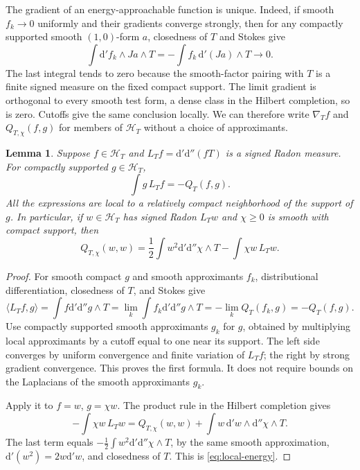 \documentclass[11pt]{article}
\newtheorem{lemma}[theorem]{Lemma}
\newcommand{\dd}{\mathrm d'\mathrm d''}
\begin{document}
The gradient of an energy-approachable function is unique. Indeed,
if smooth $f_k\to0$ uniformly and their gradients converge strongly,
then for any compactly supported smooth $(1,0)$-form $a$, closedness of
$T$ and Stokes give
\[
 \int\mathrm d'f_k\wedge Ja\wedge T
       =-\int f_k\,\mathrm d'(Ja)\wedge T\longrightarrow0.
\]
The last integral tends to zero because the smooth-factor pairing with
$T$ is a finite signed measure on the fixed compact support.
The limit gradient is orthogonal to every smooth test form, a dense
class in the Hilbert completion, so is zero. Cutoffs give the same
conclusion locally. We can therefore write $\nabla_T f$ and
$Q_{T,\chi}(f,g)$ for members of $\mathscr H_T$ without a choice of
approximants.

\begin{lemma}\label{lem:test}
Suppose $f\in\mathscr H_T$ and $L_Tf=\dd(fT)$ is a signed Radon
measure. For compactly supported $g\in\mathscr H_T$,
\[
                 \int g\,L_Tf=-Q_T(f,g).
\]
All the expressions are local to a relatively compact neighborhood of
the support of $g$. In particular, if $w\in\mathscr H_T$ has signed
Radon $L_Tw$ and $\chi\geq0$ is smooth with compact support, then
\begin{equation}\label{eq:local-energy}
 Q_{T,\chi}(w,w)=\frac12\int w^2\dd\chi\wedge T
                         -\int\chi w\,L_Tw.
\end{equation}
\end{lemma}
\begin{proof}
For smooth compact $g$ and smooth approximants $f_k$, distributional
differentiation, closedness of $T$, and Stokes give
\[
 \langle L_Tf,g\rangle=\int f\dd g\wedge T
    =\lim_k\int f_k\dd g\wedge T
    =-\lim_k Q_T(f_k,g)=-Q_T(f,g).
\]
Use compactly supported smooth approximants $g_k$ for $g$, obtained by
multiplying local approximants by a cutoff equal to one near its
support. The left side converges by uniform convergence and finite
variation of $L_Tf$; the right by strong gradient convergence. This
proves the first formula. It does not require bounds on the Laplacians
of the smooth approximants $g_k$.

Apply it to $f=w$, $g=\chi w$. The product rule in the Hilbert
completion gives
\[
 -\int\chi w\,L_Tw
     =Q_{T,\chi}(w,w)+\int w\,\mathrm d'w\wedge\mathrm d''\chi\wedge T.
\]
The last term equals $-\tfrac12\int w^2\dd\chi\wedge T$, by the
same smooth approximation, $\mathrm d'(w^2)=2w\mathrm d'w$, and
closedness of $T$. This is \eqref{eq:local-energy}.
\end{proof}
\end{document}
